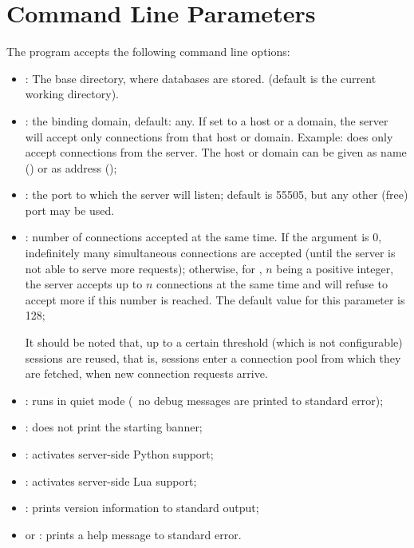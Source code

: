 \section{Command Line Parameters}
\begin{minipage}{\textwidth}
The program accepts the following
command line options:

\begin{itemize}
\item {}: The base directory,
where databases are stored.
(default is the current working directory).

\item {}: the binding domain, default:
any. If set to a host or a domain, the server
will accept only connections from that host
or domain. Example:  does
only accept connections from the server.
The host or domain can be given as name ()
or as  address ();

\item {}: the port to which
the server will listen; default is 55505,
but any other (free) port may be used.
 
\item {}: number of connections accepted at the same time.
If the argument is 0, indefinitely many
simultaneous connections are accepted
(until the server is not able to serve more requests);
otherwise, for ,
$n$ being a positive integer,
the server accepts
up to $n$ connections at the same time and
will refuse to accept more if this number is reached.
The default value for this parameter is 128;

It should be noted that, up to a certain threshold
(which is not configurable) sessions are
reused, that is, sessions enter a connection pool
from which they are fetched, when new connection
requests arrive.

\item {}: runs in quiet mode
(\ie\ no debug messages are printed to standard error);
\item {}: does not print the starting banner;
\item {}: activates server-side Python support;
\item {}: activates server-side Lua support;
\item {}: prints version information to standard output;
\item {} or : prints a help message to standard error.
\end{itemize}
\end{minipage}

